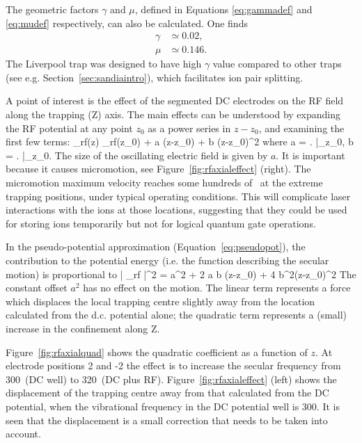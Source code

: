 The geometric factors $\gamma$ and $\mu$, defined in Equations \ref{eq:gammadef} and \ref{eq:mudef} respectively, can  also be calculated. One finds
\begin{align}
\gamma & \simeq 0.02,\\
\mu & \simeq 0.146.
\end{align}
The Liverpool trap was designed to have high $\gamma$ value compared to other traps (see e.g. Section~\ref{sec:sandiaintro}), which facilitates ion pair splitting. 


A point of interest is the effect of the segmented DC electrodes on the RF field along the trapping (Z) axis. The main effects can be understood by expanding the RF potential at any point $z_0$ as a power series in $z-z_0$, and examining the first few terms:
\be
\phi_{\rm rf}(z) \simeq \phi_{\rm rf}(z_0) + a (z-z_0) + b (z-z_0)^2
\ee
where
\be
a = \left.  \right|_{z_0}, \;\;\;\;
b =  \left.  \right|_{z_0}.
\label{eq:rfcoeffs}
\ee
The size of the oscillating electric field is given by $a$. It is important because it causes micromotion, see Figure~\ref{fig:rfaxialeffect} (right). The micromotion maximum velocity reaches some hundreds of \mps\, at the extreme trapping positions, under typical operating conditions. This will complicate laser interactions with the ions at those locations, suggesting that they could be used for storing ions temporarily but not for logical quantum gate operations.

In the pseudo-potential approximation (Equation~\ref{eq:pseudopot}), the contribution to the potential energy (i.e. the function describing the secular motion) is proportional to 
\be
\left| \nabla \phi_{\rm rf} \right|^2 = a^2 + 2 a b (z-z_0) + 4 b^2(z-z_0)^2
\ee
The constant offset $a^2$ has no effect on the motion. The linear term represents a force which displaces the local trapping centre slightly away from the location calculated from the d.c. potential alone; the quadratic term represents a (small) increase in the confinement along Z.

Figure~\ref{fig:rfaxialquad} shows the quadratic coefficient as a function of $z$. At electrode positions 2 and -2 the effect is to increase the secular frequency from 300\kHz\, (DC well) to 320\kHz\, (DC plus RF). Figure~\ref{fig:rfaxialeffect} (left) shows the displacement of the trapping centre away from that calculated from the DC potential, when the vibrational frequency in the DC potential well is 300\kHz. It is seen that the displacement is a small correction that needs to be taken into account.



